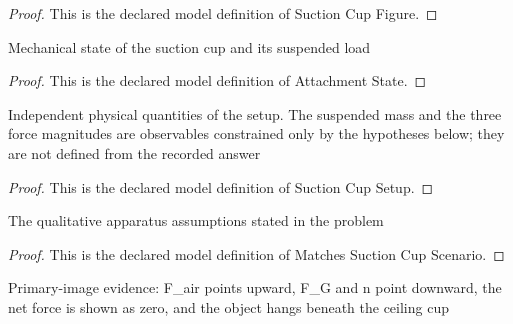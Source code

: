 \begin{proof}
  This is the declared model definition of Suction Cup Figure.
\end{proof}
\begin{definition}
  \label{def:physics:phyx-mini-0720:phyxminiproblems-problemphyxmini0720-attachmentstate}
  Mechanical state of the suction cup and its suspended load
\end{definition}
\begin{proof}
  This is the declared model definition of Attachment State.
\end{proof}
\begin{definition}
  \label{def:physics:phyx-mini-0720:phyxminiproblems-problemphyxmini0720-suctioncupsetup}
  Independent physical quantities of the setup. The suspended mass and the three force magnitudes are observables constrained only by the hypotheses below; they are not defined from the recorded answer
\end{definition}
\begin{proof}
  This is the declared model definition of Suction Cup Setup.
\end{proof}
\begin{definition}
  \label{def:physics:phyx-mini-0720:phyxminiproblems-problemphyxmini0720-matchessuctioncupscenario}
  The qualitative apparatus assumptions stated in the problem
\end{definition}
\begin{proof}
  This is the declared model definition of Matches Suction Cup Scenario.
\end{proof}
\begin{definition}
  \label{def:physics:phyx-mini-0720:phyxminiproblems-problemphyxmini0720-matchessuppliedfigure}
  Primary-image evidence: F\_air points upward, F\_G and n point downward, the net force is shown as zero, and the object hangs beneath the ceiling cup
\end{definition}
